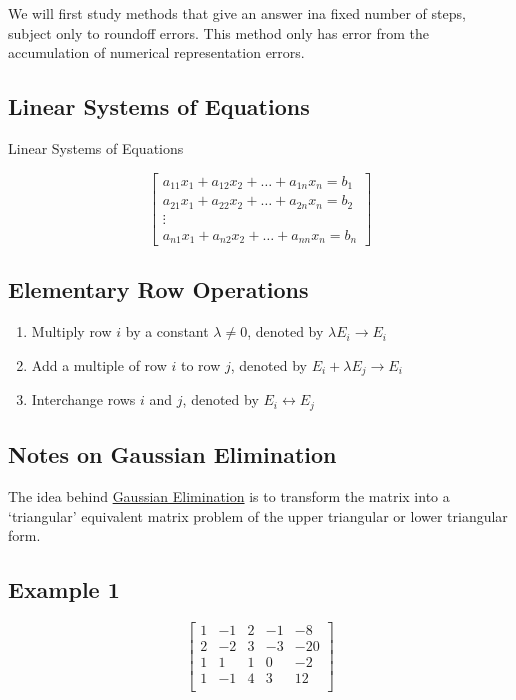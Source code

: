 We will first study methods that give an answer ina  fixed number of steps, 
subject only to roundoff errors. This method only has error from the accumulation
of numerical representation errors.

\subsection{Linear Systems of Equations}

Linear Systems of Equations

\begin{equation*}
  \begin{bmatrix}
    a_{11} x_1 + a_{12} x_2 + \dots + a_{1n} x_n = b_1 \\
    a_{21} x_1 + a_{22} x_2 + \dots + a_{2n} x_n = b_2 \\
    \vdots \\
    a_{n1} x_1 + a_{n2} x_2 + \dots + a_{nn} x_n = b_n
  \end{bmatrix}
\end{equation*}

\subsection{Elementary Row Operations}

\begin{enumerate}
\item Multiply row $i$ by a constant $\lambda \ne 0$, denoted by 
  $\lambda E_i \to E_i$
\item Add a multiple of row $i$ to row $j$, denoted by $E_i + \lambda E_j \to E_i$
\item Interchange rows $i$ and $j$, denoted by $E_i \leftrightarrow E_j$
\end{enumerate}

\subsection{Notes on Gaussian Elimination}

The idea behind \uline{Gaussian Elimination} is to transform the matrix into
a \enquote*{triangular} equivalent matrix problem of the upper triangular
or lower triangular form.

\subsection{Example 1}

\begin{equation*}
  \begin{bmatrix}
  1 & -1 & 2 & -1 & -8\\
  2 & -2 & 3 & -3 & -20\\
  1 & 1 & 1 & 0 & -2\\
  1 & -1 & 4 & 3 & 12\\
  \end{bmatrix}
\end{equation*}

